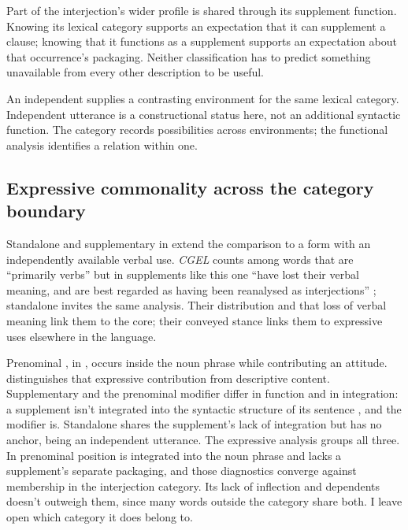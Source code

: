 \documentclass[12pt]{article}
\begin{document}
Part of the interjection's wider profile is shared through its supplement
function. Knowing its lexical category supports an expectation that it can
supplement a clause; knowing that it functions as a supplement supports an
expectation about that occurrence's packaging. Neither classification has to
predict something unavailable from every other description to be useful.

An independent  supplies a contrasting environment for
the same lexical category. Independent utterance is a constructional
status here, not an additional syntactic function. The category records
possibilities across environments; the functional analysis identifies a
relation within one.

\subsection{Expressive commonality across the category boundary}\label{sec:damn-profiles}

Standalone  and supplementary  in
 extend the comparison to a form
with an independently available verbal use. \textit{CGEL} counts
 among words that are \enquote{primarily verbs} but in
supplements like this one \enquote{have lost their verbal meaning, and are
best regarded as having been reanalysed as interjections}
\citep[1361]{HuddlestonPullum2002}; standalone  invites the
same analysis. Their distribution and that loss of verbal meaning link them
to the core; their conveyed stance links them to
expressive uses elsewhere in the language.

Prenominal , in , occurs inside the
noun phrase while contributing an attitude. \textcite[166, 181]{potts2007}
distinguishes that expressive contribution from descriptive content.
Supplementary  and the prenominal modifier differ in function
and in integration: a supplement isn't integrated into the syntactic
structure of its sentence \citep[1350]{HuddlestonPullum2002}, and the
modifier is. Standalone  shares the supplement's lack of
integration but has no anchor, being an independent utterance. The
expressive analysis groups all three. In prenominal position 
is integrated into the noun phrase and lacks a supplement's separate
packaging, and those diagnostics converge against membership in the
interjection category. Its lack of inflection and dependents doesn't
outweigh them, since many words outside the category share both. I leave
open which category it does belong to.
\end{document}
